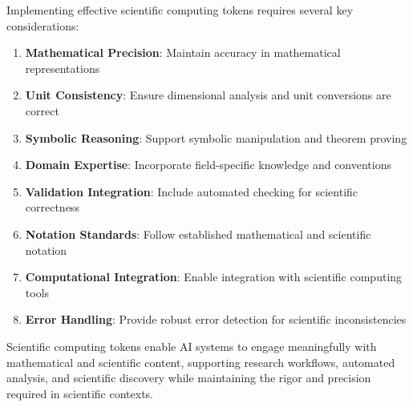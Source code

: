 Implementing effective scientific computing tokens requires several key considerations:

\begin{enumerate}
\item \textbf{Mathematical Precision}: Maintain accuracy in mathematical representations
\item \textbf{Unit Consistency}: Ensure dimensional analysis and unit conversions are correct
\item \textbf{Symbolic Reasoning}: Support symbolic manipulation and theorem proving
\item \textbf{Domain Expertise}: Incorporate field-specific knowledge and conventions
\item \textbf{Validation Integration}: Include automated checking for scientific correctness
\item \textbf{Notation Standards}: Follow established mathematical and scientific notation
\item \textbf{Computational Integration}: Enable integration with scientific computing tools
\item \textbf{Error Handling}: Provide robust error detection for scientific inconsistencies
\end{enumerate}

Scientific computing tokens enable AI systems to engage meaningfully with mathematical and scientific content, supporting research workflows, automated analysis, and scientific discovery while maintaining the rigor and precision required in scientific contexts.
